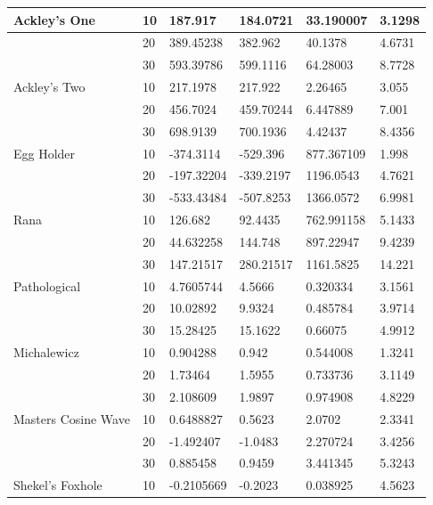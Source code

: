 \documentclass[paper=a4, fontsize=11pt]{scrartcl}
\numberwithin{equation}{section}
\numberwithin{figure}{section}
\numberwithin{table}{section}
\begin{document}
{\begin{tabular}{| l | l | l | l | l | l|}
    Ackley's One & 10 & 187.917 & 184.0721 & 33.190007 & 3.1298 \\ \hline
    		 & 20 & 389.45238 & 382.962 & 40.1378 & 4.6731 \\ \hline
     		& 30 & 593.39786 & 599.1116 & 64.28003 & 8.7728 \\ \hline

    Ackley's Two & 10 & 217.1978 & 217.922 & 2.26465 & 3.055 \\ \hline
    		 & 20 & 456.7024 & 459.70244 & 6.447889 & 7.001 \\ \hline
    		 & 30 & 698.9139 & 700.1936 & 4.42437 & 8.4356 \\ \hline

    Egg Holder & 10 & -374.3114 & -529.396 & 877.367109 & 1.998 \\ \hline
    		 & 20 & -197.32204 & -339.2197 & 1196.0543 & 4.7621 \\ \hline
    		 & 30 & -533.43484 & -507.8253 & 1366.0572 & 6.9981 \\ \hline

    Rana & 10 & 126.682 & 92.4435 & 762.991158 & 5.1433 \\ \hline
   		     & 20 & 44.632258 & 144.748 & 897.22947 & 9.4239 \\ \hline
    		 & 30 & 147.21517 & 280.21517 & 1161.5825 & 14.221 \\ \hline

    Pathological & 10 & 4.7605744 &  4.5666& 0.320334 & 3.1561 \\ \hline
     		& 20 & 10.02892 & 9.9324 & 0.485784 & 3.9714 \\ \hline
    		 & 30 & 15.28425 & 15.1622 & 0.66075 & 4.9912 \\ \hline

    Michalewicz & 10 & 0.904288 & 0.942 & 0.544008 & 1.3241 \\ \hline
    		 & 20 & 1.73464 &  1.5955 & 0.733736 & 3.1149 \\ \hline
    		 & 30 & 2.108609 & 1.9897 & 0.974908 & 4.8229 \\ \hline

    Masters Cosine Wave & 10 &0.6488827 & 0.5623 & 2.0702 & 2.3341 \\ \hline
    		 & 20 &  -1.492407& -1.0483& 2.270724 & 3.4256 \\ \hline
    		 & 30 & 0.885458 & 0.9459 & 3.441345 & 5.3243 \\ \hline

    Shekel's Foxhole & 10 & -0.2105669 & -0.2023 & 0.038925 & 4.5623 \\ \hline


\end{tabular}
}
\end{document}
